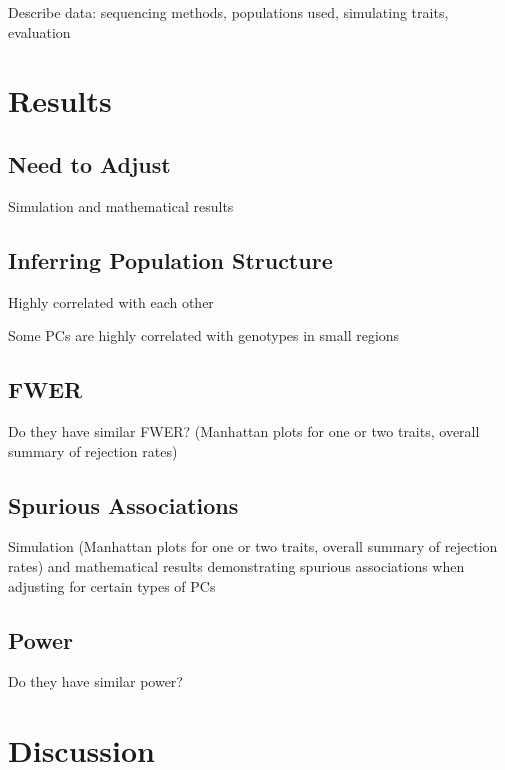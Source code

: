 \documentclass[12pt]{article}
\newcommand{\edit}[1]{{\color{red}{#1}}}
\begin{document}
Describe data: sequencing methods, populations used, simulating traits, evaluation


\section{Results}

\subsection{Need to Adjust}

Simulation and mathematical results

\subsection{Inferring Population Structure}

Highly correlated with each other

Some PCs are highly correlated with genotypes in small regions

\noindent\edit{This could also go after we show spurious assoc results: here's the problem $>$ here's where we think the problem is coming from}

\subsection{FWER}

Do they have similar FWER? (Manhattan plots for one or two traits, overall summary of rejection rates)

\noindent\edit{Is it appropriate to use the same significance threshold for both?}

\subsection{Spurious Associations}

Simulation (Manhattan plots for one or two traits, overall summary of rejection rates) and mathematical results demonstrating spurious associations when adjusting for certain types of PCs

\subsection{Power}

Do they have similar power?


\section{Discussion}
\end{document}
